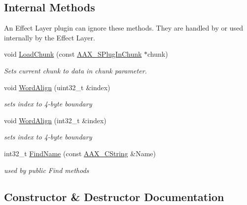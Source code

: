\subsection*{Internal Methods}
\label{_amgrpafe66b15a1c39dd0e784226f4403c2d5}%
An Effect Layer plugin can ignore these methods. They are handled by or used internally by the Effect Layer. \begin{DoxyCompactItemize}
\item 
void \mbox{\hyperlink{a01461_a25fc41a1060445db4d7bee7a2919460d}{Load\+Chunk}} (const \mbox{\hyperlink{a01421}{A\+A\+X\+\_\+\+S\+Plug\+In\+Chunk}} $\ast$chunk)
\begin{DoxyCompactList}\small\item\em Sets current chunk to data in {\itshape chunk} parameter. \end{DoxyCompactList}\item 
void \mbox{\hyperlink{a01461_acaf10308e9758014bff6872b4260a9e1}{Word\+Align}} (uint32\+\_\+t \&index)
\begin{DoxyCompactList}\small\item\em sets {\itshape index} to 4-\/byte boundary \end{DoxyCompactList}\item 
void \mbox{\hyperlink{a01461_a90dc10c7cb3f1a9af70179be70a8d739}{Word\+Align}} (int32\+\_\+t \&index)
\begin{DoxyCompactList}\small\item\em sets {\itshape index} to 4-\/byte boundary \end{DoxyCompactList}\item 
int32\+\_\+t \mbox{\hyperlink{a01461_a66556bfad37d6541cf4d317a48d099c2}{Find\+Name}} (const \mbox{\hyperlink{a01573}{A\+A\+X\+\_\+\+C\+String}} \&Name)
\begin{DoxyCompactList}\small\item\em used by public Find methods \end{DoxyCompactList}\end{DoxyCompactItemize}


\subsection{Constructor \& Destructor Documentation}
\mbox{\label{a01461_acf61d78b965c04e6af597379edad5a39}} 
